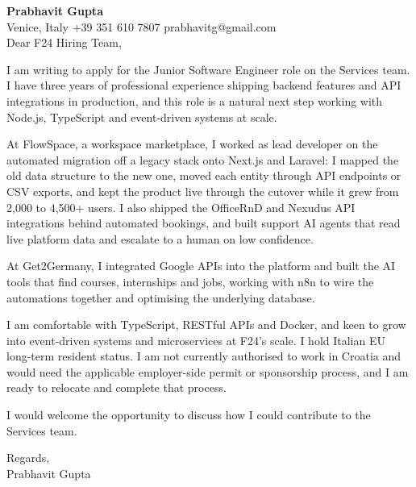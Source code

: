 \documentclass[a4paper,10.5pt]{article}
\begin{document}
\textbf{Prabhavit Gupta}\\
Venice, Italy \textbar{} +39 351 610 7807 \textbar{} prabhavitg@gmail.com\\[10pt]
Dear F24 Hiring Team,

I am writing to apply for the Junior Software Engineer role on the Services team. I have three years of professional experience shipping backend features and API integrations in production, and this role is a natural next step working with Node.js, TypeScript and event-driven systems at scale.

At FlowSpace, a workspace marketplace, I worked as lead developer on the automated migration off a legacy stack onto Next.js and Laravel: I mapped the old data structure to the new one, moved each entity through API endpoints or CSV exports, and kept the product live through the cutover while it grew from 2,000 to 4,500+ users. I also shipped the OfficeRnD and Nexudus API integrations behind automated bookings, and built support AI agents that read live platform data and escalate to a human on low confidence.

At Get2Germany, I integrated Google APIs into the platform and built the AI tools that find courses, internships and jobs, working with n8n to wire the automations together and optimising the underlying database.

I am comfortable with TypeScript, RESTful APIs and Docker, and keen to grow into event-driven systems and microservices at F24's scale. I hold Italian EU long-term resident status. I am not currently authorised to work in Croatia and would need the applicable employer-side permit or sponsorship process, and I am ready to relocate and complete that process.

I would welcome the opportunity to discuss how I could contribute to the Services team.

Regards,\\
Prabhavit Gupta
\end{document}
